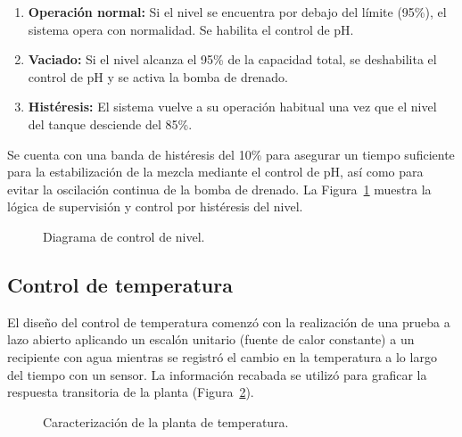 \documentclass[11pt,tesis,twoside,openright,spanish]{upiiztt}
\begin{document}
\begin{enumerate}
  \item \textbf{Operación normal:} Si el nivel se encuentra por debajo del límite (95\%), el sistema opera con normalidad. Se habilita el control de pH.
  \item \textbf{Vaciado:} Si el nivel alcanza el 95\% de la capacidad total, se deshabilita el control de pH y se activa la bomba de drenado.
  \item \textbf{Histéresis:} El sistema vuelve a su operación habitual una vez que el nivel del tanque desciende del 85\%.
\end{enumerate}

Se cuenta con una banda de histéresis del 10\% para asegurar un tiempo suficiente
para la estabilización de la mezcla mediante el control de pH, así como para evitar
la oscilación continua de la bomba de drenado. La Figura~\ref{fig:control_nivel} muestra la lógica
de supervisión y control por histéresis del nivel.

\begin{figure}[H]
  \centering
  \caption{Diagrama de control de nivel.}
  \label{fig:control_nivel}
\end{figure}

\subsection{Control de temperatura}

El diseño del control de temperatura comenzó con la realización de una prueba a
lazo abierto aplicando un escalón unitario (fuente de calor constante) a un
recipiente con agua mientras se registró el cambio en la temperatura a lo largo del
tiempo con un sensor. La información recabada se utilizó para graficar la respuesta
transitoria de la planta (Figura~\ref{fig:planta_temp}).

\begin{figure}[H]
  \centering
  \caption{Caracterización de la planta de temperatura.}
  \label{fig:planta_temp}
\end{figure}
\end{document}
